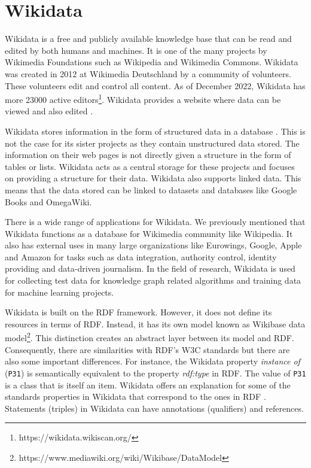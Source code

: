 \section{Wikidata}
Wikidata is a free and publicly available knowledge base that can be read and edited by both humans and machines. It is one of the many projects by Wikimedia Foundations such as Wikipedia and Wikimedia Commons. Wikidata was created in 2012 at Wikimedia Deutschland by a community of volunteers. These volunteers edit and control all content. As of December 2022, Wikidata has more 23000 active editors\footnote{https://wikidata.wikiscan.org/}. Wikidata provides a website where data can be viewed and also edited \cite{Foundationa}.

Wikidata stores information in the form of structured data in a database \cite{Tharani2021}. This is not the case for its sister projects as they contain unstructured data stored. The information on their web pages is not directly given a structure in the form of tables or lists. Wikidata acts as a central storage for these projects and focuses on providing a structure for their data. Wikidata also supports linked data. This means that the data stored can be linked to datasets and databases like Google Books and OmegaWiki.

There is a wide range of applications for Wikidata. We previously mentioned that Wikidata functions as a database for Wikimedia community like Wikipedia. It also has external uses in many large organizations like Eurowings, Google, Apple and Amazon for tasks such as data integration, authority control, identity providing and data-driven journalism. In the field of research, Wikidata is used for collecting test data for knowledge graph related algorithms and training data for machine learning projects.

Wikidata is built on the RDF framework. However, it does not define its resources in terms of RDF. Instead, it has its own model known as Wikibase data model\footnote{https://www.mediawiki.org/wiki/Wikibase/DataModel}. This distinction creates an abstract layer between its model and RDF. Consequently, there are similarities with RDF’s W3C standards but there are also some important differences. For instance, the Wikidata property \textit{instance of} (\texttt{P31}) is semantically equivalent to the property \textit{rdf:type} in RDF. The value of \texttt{P31} is a class that is itself an item. Wikidata offers an explanation for some of the standards properties in Wikidata that correspond to the ones in RDF \cite{Foundation}. Statements (triples) in Wikidata can have annotations (qualifiers) and references.

